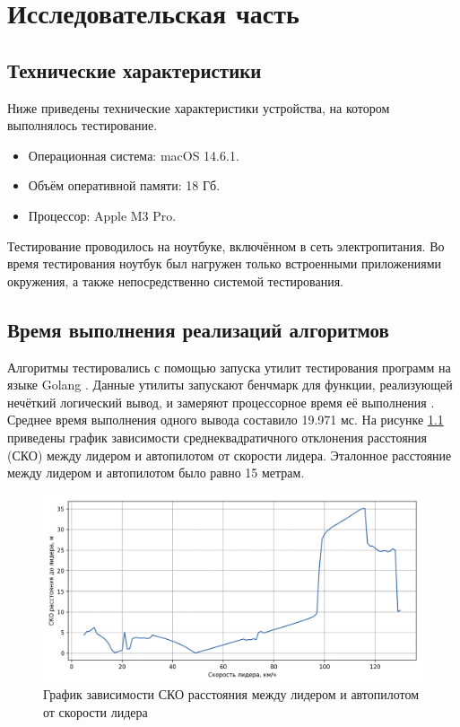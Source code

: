 \chapter{Исследовательская часть}

\section{Технические характеристики}

Ниже приведены технические характеристики устройства, на котором выполнялось тестирование.

\begin{itemize}
	\item Операционная система: macOS 14.6.1.
	\item Объём оперативной памяти: 18 Гб.
	\item Процессор: Apple M3 Pro.
\end{itemize}

Тестирование проводилось на ноутбуке, включённом в сеть электропитания. Во время тестирования ноутбук был нагружен только встроенными приложениями окружения, а также непосредственно системой тестирования.

% 

\section{Время выполнения реализаций алгоритмов}

Алгоритмы тестировались с помощью запуска утилит тестирования программ на языке Golang \cite{testing_functions} \cite{testing_flags} \cite{pprof}. Данные утилиты запускают бенчмарк для функции, реализующей нечёткий логический вывод, и замеряют процессорное время её выполнения \cite{golang_prof}. Среднее время выполнения одного вывода составило 19.971 мс. На рисунке \ref{img:deviation} приведены график зависимости среднеквадратичного отклонения расстояния (СКО) между лидером и автопилотом от скорости лидера. Эталонное расстояние между лидером и автопилотом было равно 15 метрам.

\begin{figure}[h!]
	\begin{center}
		\includegraphics[width=\textwidth]{images/deviation.png}
	\end{center}
	\caption{График зависимости СКО расстояния между лидером и автопилотом от скорости лидера}
	\label{img:deviation}
\end{figure}

